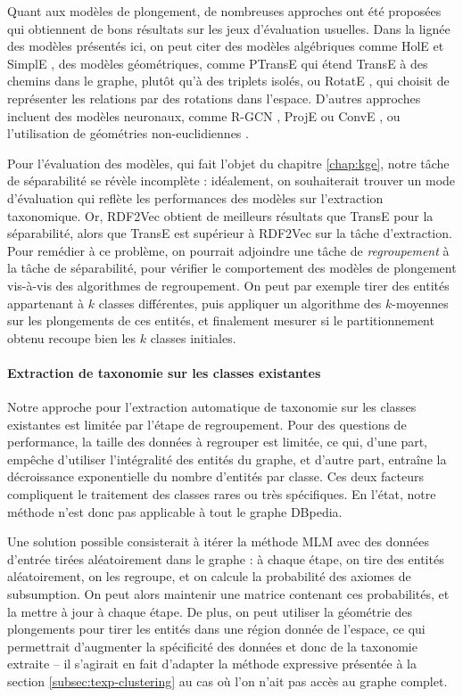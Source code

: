 Quant aux modèles de plongement, de nombreuses approches ont été proposées qui obtiennent de bons résultats sur les jeux d'évaluation usuelles. Dans la lignée des modèles présentés ici, on peut citer des modèles algébriques comme HolE \cite{hole2016} et SimplE \cite{simple2018}, des modèles géométriques, comme PTransE \cite{ptranse} qui étend TransE à des chemins dans le graphe, plutôt qu'à des triplets isolés, ou RotatE \cite{rotate2019}, qui choisit de représenter les relations par des rotations dans l'espace. D'autres approches incluent des modèles neuronaux, comme R-GCN \cite{rgcn2018}, ProjE \cite{proje2017} ou ConvE \cite{conve2018}, ou l'utilisation de géométries non-euclidiennes \cite{nickel2017poincare, nickel2018learning}.

Pour l'évaluation des modèles, qui fait l'objet du chapitre \ref{chap:kge}, notre tâche de séparabilité se révèle incomplète : idéalement, on souhaiterait trouver un mode d'évaluation qui reflète les performances des modèles sur l'extraction taxonomique. Or, RDF2Vec obtient de meilleurs résultats que TransE pour la séparabilité, alors que TransE est supérieur à RDF2Vec sur la tâche d'extraction.  
Pour remédier à ce problème, on pourrait adjoindre une tâche de \textit{regroupement} à la tâche de séparabilité, pour vérifier le comportement des modèles de plongement vis-à-vis des algorithmes de regroupement. 
On peut par exemple tirer des entités appartenant à $k$ classes différentes, puis appliquer un algorithme des $k$-moyennes sur les plongements de ces entités, et finalement mesurer si le partitionnement obtenu recoupe bien les $k$ classes initiales.

\paragraph{Extraction de taxonomie sur les classes existantes}

Notre approche pour l'extraction automatique de taxonomie sur les classes existantes est limitée par l'étape de regroupement. Pour des questions de performance, la taille des données à regrouper est limitée, ce qui, d'une part, empêche d'utiliser l'intégralité des entités du graphe, et d'autre part, entraîne la décroissance exponentielle du nombre d'entités par classe. Ces deux facteurs compliquent le traitement des classes rares ou très spécifiques. En l'état, notre méthode n'est donc pas applicable à tout le graphe DBpedia.

Une solution possible consisterait à itérer la méthode MLM avec des données d'entrée tirées aléatoirement dans le graphe : à chaque étape, on tire des entités aléatoirement, on les regroupe, et on calcule la probabilité des axiomes de subsumption. On peut alors maintenir une matrice contenant ces probabilités, et la mettre à jour à chaque étape. De plus, on peut utiliser la géométrie des plongements pour tirer les entités dans une région donnée de l'espace, ce qui permettrait d'augmenter la spécificité des données et donc de la taxonomie extraite – il s'agirait en fait d'adapter la méthode expressive présentée à la section \ref{subsec:texp-clustering} au cas où l'on n'ait pas accès au graphe complet.


